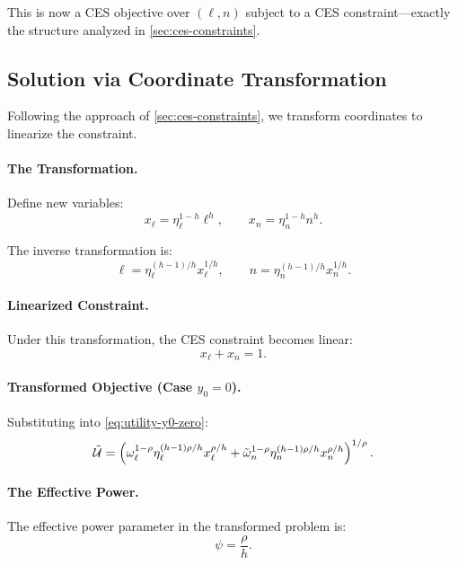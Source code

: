 This is now a CES objective over $(\ell, n)$ subject to a CES constraint---exactly the structure analyzed in \cref{sec:ces-constraints}.

\subsection{Solution via Coordinate Transformation}
\label{subsec:labor-transformation}

Following the approach of \cref{sec:ces-constraints}, we transform coordinates to linearize the constraint.

\paragraph{The Transformation.}
Define new variables:
\begin{equation}
x_\ell = \eta_\ell^{1-h} \ell^h, \qquad x_n = \eta_n^{1-h} n^h.
\label{eq:transform-labor}
\end{equation}

The inverse transformation is:
\begin{equation}
\ell = \eta_\ell^{(h-1)/h} x_\ell^{1/h}, \qquad n = \eta_n^{(h-1)/h} x_n^{1/h}.
\label{eq:transform-labor-inverse}
\end{equation}

\paragraph{Linearized Constraint.}
Under this transformation, the CES constraint becomes linear:
\begin{equation}
x_\ell + x_n = 1.
\label{eq:constraint-linear-labor}
\end{equation}

\paragraph{Transformed Objective (Case $y_0 = 0$).}
Substituting into \eqref{eq:utility-y0-zero}:
\begin{equation}
\tilde{\mathcal{U}} = \left( \omega_\ell^{1-\rho} \eta_\ell^{(h-1)\rho/h} x_\ell^{\rho/h} + \tilde{\omega}_n^{1-\rho} \eta_n^{(h-1)\rho/h} x_n^{\rho/h} \right)^{1/\rho}.
\label{eq:utility-transformed-labor}
\end{equation}

\paragraph{The Effective Power.}
The effective power parameter in the transformed problem is:
\begin{equation}
\boxed{\psi = \frac{\rho}{h}.}
\label{eq:psi-labor}
\end{equation}

